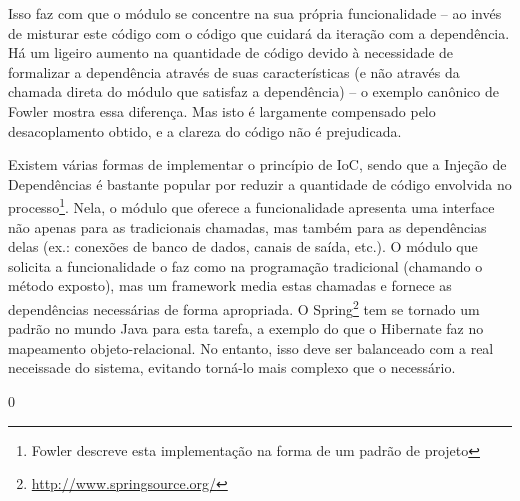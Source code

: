 \documentclass{abnt}
\begin{document}
Isso faz com que o módulo se concentre na sua própria funcionalidade – ao invés de misturar este código com o código que cuidará da iteração com a dependência. Há um ligeiro aumento na quantidade de código devido à necessidade de formalizar a dependência através de suas características (e não através da chamada direta do módulo que satisfaz a dependência) – o exemplo canônico de Fowler mostra essa diferença. Mas isto é largamente compensado pelo desacoplamento obtido, e a clareza do código não é prejudicada.

Existem várias formas de implementar o princípio de IoC, sendo que a Injeção de Dependências é bastante popular por reduzir a quantidade de código envolvida no processo\footnote{Fowler descreve esta implementação na forma de um padrão de projeto\cite{FowlerInjdep}}. Nela, o módulo que oferece a funcionalidade apresenta uma interface não apenas para as tradicionais chamadas, mas também para as dependências delas (ex.: conexões de banco de dados, canais de saída, etc.). O módulo que solicita a funcionalidade o faz como na programação tradicional (chamando o método exposto), mas um framework media estas chamadas e fornece as dependências necessárias de forma apropriada. O Spring\footnote{\url{http://www.springsource.org/}} tem se tornado um padrão no mundo Java para esta tarefa, a exemplo do que o Hibernate faz no mapeamento objeto-relacional. No entanto, isso deve ser balanceado com a real neceissade do sistema, evitando torná-lo mais complexo que o necessário.



0


\end{document}
